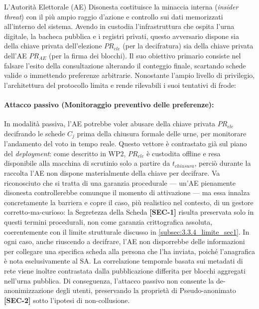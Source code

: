 L'Autorità Elettorale (AE) Disonesta costituisce la minaccia interna (\textit{insider threat}) con il più ampio raggio d'azione e controllo sui dati memorizzati all'interno del sistema. Avendo in custodia l'infrastruttura che ospita l'urna digitale, la bacheca pubblica e i registri privati, questo avversario dispone sia della chiave privata dell'elezione $PR_{ele}$ (per la decifratura) sia della chiave privata dell'AE $PR_{AE}$ (per la firma dei blocchi). Il suo obiettivo primario consiste nel falsare l'esito della consultazione alterando il conteggio finale, scartando schede valide o immettendo preferenze arbitrarie. Nonostante l'ampio livello di privilegio, l'architettura del protocollo limita e rende rilevabili i suoi tentativi di frode:

\paragraph{Attacco passivo (Monitoraggio preventivo delle preferenze):} In modalità passiva, l'AE potrebbe voler abusare della chiave privata $PR_{ele}$ decifrando le schede $C_j$ prima della chiusura formale delle urne, per monitorare l'andamento del voto in tempo reale. Questo vettore è contrastato già sul piano del \textit{deployment}: come descritto in WP2, $PR_{ele}$ è custodita offline e resa disponibile alla macchina di scrutinio solo a partire da $t_{chiusura}$, perciò durante la raccolta l'AE non dispone materialmente della chiave per decifrare. Va riconosciuto che si tratta di una garanzia procedurale --- un'AE pienamente disonesta controllerebbe comunque il momento di attivazione --- ma essa innalza concretamente la barriera e copre il caso, più realistico nel contesto, di un gestore corretto-ma-curioso: la Segretezza della Scheda \textbf{[SEC-1]} risulta preservata solo in questi termini procedurali, non come garanzia crittografica assoluta, coerentemente con il limite strutturale discusso in \ref{subsec:3.3.4_limite_sec1}. In ogni caso, anche riuscendo a decifrare, l'AE non disporrebbe delle informazioni per collegare una specifica scheda alla persona che l'ha inviata, poiché l'anagrafica è nota esclusivamente al SA. La correlazione temporale basata sui metadati di rete viene inoltre contrastata dalla pubblicazione differita per blocchi aggregati nell'urna pubblica. Di conseguenza, l'attacco passivo non consente la de-anonimizzazione degli utenti, preservando la proprietà di Pseudo-anonimato \textbf{[SEC-2]} sotto l'ipotesi di non-collusione.

